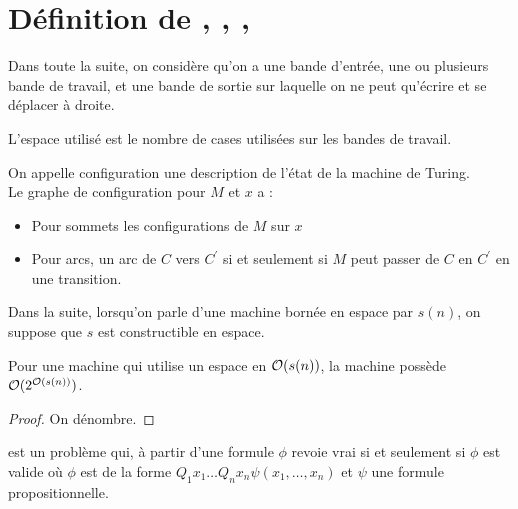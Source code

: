 \documentclass{cours}
\begin{document}
\section{Définition de , , , }
Dans toute la suite, on considère qu'on a une bande d'entrée, une ou plusieurs bande de travail, et une bande de sortie sur laquelle on ne peut qu'écrire et se déplacer à droite. 
\begin{definition}
    L'espace utilisé est le nombre de cases utilisées sur les bandes de travail. 
\end{definition}

\begin{definition}
\end{definition}


\begin{definition}[Configurations]
    On appelle configuration une description de l'état de la machine de Turing.\\
    Le graphe de configuration pour $M$ et $x$ a : 
    \begin{itemize}
        \item Pour sommets les configurations de $M$ sur $x$
        \item Pour arcs, un arc de $C$ vers $C^{'}$ si et seulement si $M$ peut passer de $C$ en $C^{'}$ en une transition. 
    \end{itemize}
\end{definition}

Dans la suite, lorsqu'on parle d'une machine bornée en espace par $s(n)$, on suppose que $s$ est constructible en espace. 

\begin{proposition}
    Pour une machine qui utilise un espace en $\mathcal{O}(s(n))$, la machine possède $\mathcal{O}(2^{\mathcal{O}(s(n))})$.
\end{proposition}
\begin{proof}
    On dénombre.
\end{proof}

\begin{definition}[QBF]
     est un problème qui, à partir d'une formule $\phi$ revoie vrai si et seulement si $\phi$ est valide où $\phi$ est de la forme $Q_{1}x_{1} \ldots Q_{n}x_{n}\psi(x_{1}, \ldots, x_{n})$ et $\psi$ une formule propositionnelle. 
\end{definition}
\end{document}
